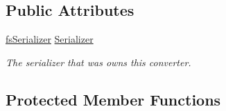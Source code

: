 \subsection*{Public Attributes}
\begin{DoxyCompactItemize}
\item 
\hyperlink{class_full_serializer_1_1fs_serializer}{fs\+Serializer} \hyperlink{class_full_serializer_1_1fs_base_converter_a6d55e268772d23da10ce9ca3dc0e415f}{Serializer}
\begin{DoxyCompactList}\small\item\em The serializer that was owns this converter. \end{DoxyCompactList}\end{DoxyCompactItemize}
\subsection*{Protected Member Functions}
